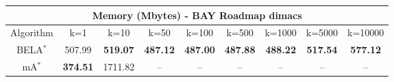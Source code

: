\begin{tabular}{c|cccccccc}\toprule
\multicolumn{9}{c}{Memory (Mbytes) - BAY Roadmap dimacs}\\ \midrule
Algorithm & k=1 & k=10 & k=50 & k=100 & k=500 & k=1000 & k=5000 & k=10000 \\ \midrule
BELA$^*$ & 507.99 & \textbf{519.07} & \textbf{487.12} & \textbf{487.00} & \textbf{487.88} & \textbf{488.22} & \textbf{517.54} & \textbf{577.12} \\
mA$^*$ & \textbf{374.51} & 1711.82 & -- & -- & -- & -- & -- & -- \\ \bottomrule 
\end{tabular}
